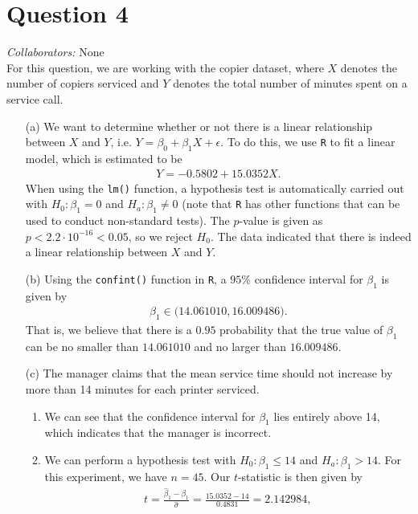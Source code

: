 \documentclass[10pt]{article}
\newcommand{\mycolab}[1]{\textcolor{colabcol}{\textsl{Collaborators:}} #1\\}
\begin{document}
\section{Question 4} \noindent
\mycolab{None}
For this question, we are working with the copier dataset, where \(X\) denotes the number of copiers serviced and \(Y\) denotes the total number of 
minutes spent on a service call. 
\begin{itemize}
    \item[(a)] We want to determine whether or not there is a linear relationship between \(X\) and \(Y\), i.e. \(Y = \beta_0 + \beta_1 X + \epsilon\). 
    To do this, we use \texttt{R} to fit a linear model, which is estimated to be 
    \begin{align*}
        Y = -0.5802 + 15.0352 X.
    \end{align*}
    When using the \texttt{lm()} function, a hypothesis test is automatically carried out with 
    \(H_0 : \beta_1 = 0\) and \(H_a : \beta_1 \neq 0\) (note that \texttt{R} has other functions that can be used to conduct non-standard tests). 
    The \(p\)-value is given as \(p < 2.2 \cdot 10^{-16} < 0.05\), so we reject \(H_0\). The data indicated that there is indeed 
    a linear relationship between \(X\) and \(Y\).
    \item[(b)] Using the \texttt{confint()} function in \texttt{R}, a \(95\%{}\) confidence interval for \(\beta_1\) is given by 
    \begin{align*}
        \beta_1 \in \big(14.061010, 16.009486\big).
    \end{align*}
    That is, we believe that there is a \(0.95\) probability that the true value of \(\beta_1\) can be no smaller than \(14.061010\) and no larger
    than \(16.009486\).
    \item[(c)] The manager claims that the mean service time should not increase by more than 14 minutes for each printer serviced. 
    \begin{enumerate}
        \item We can see that the confidence interval for \(\beta_1\) lies entirely above 14, which indicates that the manager is incorrect. 
        \item We can perform a hypothesis test with \(H_0 : \beta_1 \le 14\) and \(H_a : \beta_1 > 14\). For this experiment, we have \(n = 45\). 
        Our \(t\)-statistic is then given by 
        \begin{align*}
            t = \frac{\hat{\beta}_1 - \beta_1}{\hat{\sigma}} = \frac{15.0352 - 14}{0.4831} = 2.142984,

\end{align*}
\end{enumerate}
\end{itemize}
\end{document}
